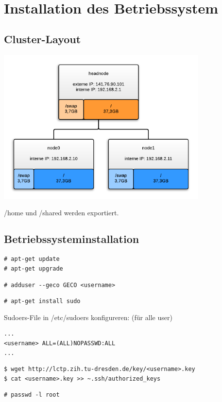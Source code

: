 \chapter{Installation des Betriebssystem}
\section{Cluster-Layout}
\includegraphics[width=400px]{cluster_layout.png}

/home und /shared werden exportiert.

\section{Betriebssysteminstallation}
\begin{lstlisting}[style=Bash]
# apt-get update 
# apt-get upgrade 
\end{lstlisting}
\begin{lstlisting}[style=Bash]
# adduser --geco GECO <username>
\end{lstlisting}
\begin{lstlisting}[style=Bash]
# apt-get install sudo
\end{lstlisting}
Sudoers-File in /etc/sudoers konfigureren:
(für alle user)
\begin{lstlisting}[style=Bash]
...
<username> ALL=(ALL)NOPASSWD:ALL
...
\end{lstlisting}
\begin{lstlisting}[style=Bash]
$ wget http://lctp.zih.tu-dresden.de/key/<username>.key
$ cat <username>.key >> ~.ssh/authorized_keys
\end{lstlisting}
\begin{lstlisting}[style=Bash]
# passwd -l root 
\end{lstlisting}


